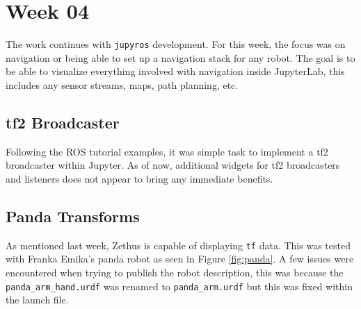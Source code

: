 \chapter{Week 04}

    The work continues with \texttt{jupyros} development. For this week, the focus was on navigation or being able to set up a navigation stack for any robot. The goal is to be able to visualize everything involved with navigation inside JupyterLab, this includes any sensor streams, maps, path planning, etc.

\section{tf2 Broadcaster}

    Following the ROS tutorial examples, it was simple task to implement a tf2 broadcaster within Jupyter. As of now, additional widgets for tf2 broadcasters and listeners does not appear to bring any immediate benefits.

    
    
    

\section{Panda Transforms}

    As mentioned last week, Zethus is capable of displaying \texttt{tf} data. This was tested with Franka Emika's panda robot as seen in Figure \ref{fig:panda}. A few issues were encountered when trying to publish the robot description, this was because the \texttt{panda\_arm\_hand.urdf} was renamed to \texttt{panda\_arm.urdf} but this was fixed within the launch file.

